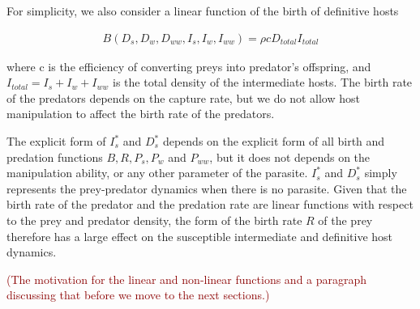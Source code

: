 \documentclass[11pt]{article}
\newcommand{\cha}[1]{\textcolor{darkred}{(#1)}}
\begin{document}
For simplicity, we also consider a linear function of the birth of definitive hosts

\begin{align*}
B(D_s, D_w, D_{ww}, I_s, I_w, I_{ww}) = \rho c D_{total} I_{total}
\end{align*}

where c is the efficiency of converting preys into predator's offspring, and $I_{total} = I_s + I_w + I_{ww}$ is the total density of the intermediate hosts.
The birth rate of the predators depends on the capture rate, but we do not allow host manipulation to affect the birth rate of the predators.

The explicit form of $I_s^*$ and $D_s^*$ depends on the explicit form of all birth and predation functions $B, R, P_s, P_w$ and $P_{ww}$, but it does not depends on the manipulation ability, or any other parameter of the parasite. $I_s^*$ and $D_s^*$ simply represents the prey-predator dynamics when there is no parasite. Given that the birth rate of the predator and the predation rate are linear functions with respect to the prey and predator density, the form of the birth rate $R$ of the prey therefore has a large effect on the susceptible intermediate and definitive host dynamics. 

\cha{The motivation for the linear and non-linear functions and a paragraph discussing that before we move to the next sections.}
\end{document}
